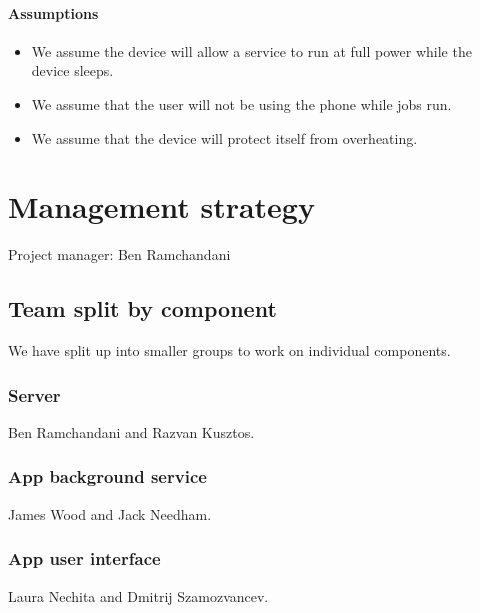 \documentclass[a4paper,10pt]{article}
\begin{document}
\paragraph{Assumptions}
\begin{itemize}
	\item We assume the device will allow a service to run at full power while the device sleeps.
	\item We assume that the user will not be using the phone while jobs run.
	\item We assume that the device will protect itself from overheating.
\end{itemize} 

\section{Management strategy}

Project manager: Ben Ramchandani

\subsection{Team split by component}

We have split up into smaller groups to work on individual components.

\subsubsection{Server}

Ben Ramchandani and Razvan Kusztos.

\subsubsection{App background service}

James Wood and Jack Needham.

\subsubsection{App user interface}

Laura Nechita and Dmitrij Szamozvancev.
\end{document}
